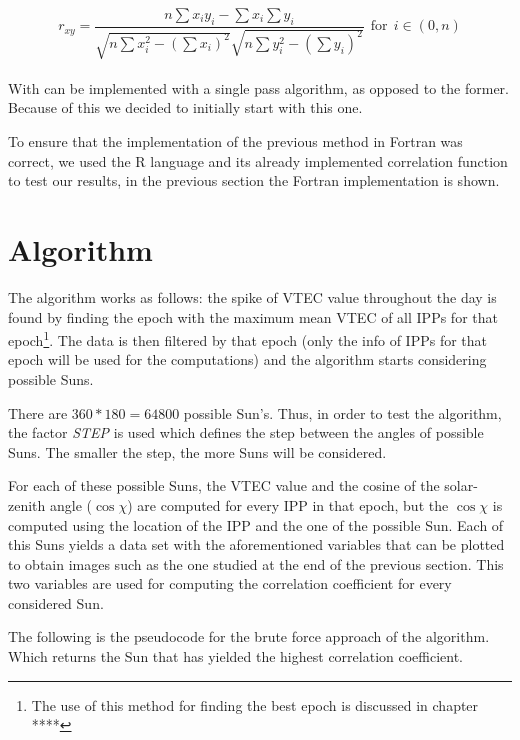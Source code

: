 \begin{equation} \label{eq:singlePass}
r_{xy} = \frac{n\sum x_{i}y_{i} - \sum x_{i}\sum y_{i}}
{\sqrt{n\sum x_{i}^{2} - (\sum x_{i})^{2}}
	\sqrt{n\sum y_{i}^{2} - (\sum y_{i})^{2}}}  \ \ \text{for} \ \ i \in (0, n)
\end{equation} \\

With can be implemented with a single pass algorithm, as opposed to the former. Because of this we decided to initially start with this one.

To ensure that the implementation of the previous method in Fortran was correct, we used the R language and its already implemented correlation function to test our results, in the previous section the Fortran implementation is shown. 

\section{Algorithm}

The algorithm works as follows: the spike of VTEC value throughout the day is found by finding the epoch with the maximum mean VTEC of all IPPs for that epoch\footnote{The use of this method for finding the best epoch is discussed in chapter **** }.
The data is then filtered by that epoch (only the info of IPPs for that epoch will be used for the computations) and the algorithm starts considering possible Suns.

There are $360 * 180 = 64800$ possible Sun's. Thus, in order to test the algorithm, the factor \textit{STEP} is used which defines the step between the angles of possible Suns. The smaller the step, the more Suns will be considered. 

For each of these possible Suns, the VTEC value and the cosine of the solar-zenith angle ($\cos \chi$) are computed for every IPP in that epoch, but the $\cos \chi$ is computed using the location of the IPP and the one of the possible Sun. Each of this Suns yields a data set with the aforementioned variables that can be plotted to obtain images such as the one studied at the end of the previous section. This two variables are used for computing the correlation coefficient for every considered Sun.

The following is the pseudocode for the brute force approach of the algorithm. Which returns the Sun that has yielded the highest correlation coefficient.

